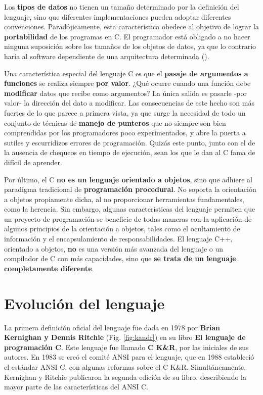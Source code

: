Los \textbf{tipos de datos} no tienen un tamaño determinado por la definición
del lenguaje, sino que diferentes implementaciones pueden adoptar
diferentes convenciones. Paradójicamente, esta característica
obedece al objetivo de lograr la \textbf{portabilidad} de los programas en C. El
programador está obligado a no hacer ninguna suposición sobre los
tamaños de los objetos de datos, ya que lo contrario haría al
software dependiente de una arquitectura determinada (). 

Una característica especial del lenguaje C es que el \textbf{pasaje de
argumentos a funciones} se realiza siempre \textbf{por valor}. ¿Qué ocurre
cuando una función debe \textbf{modificar} datos que recibe como
argumentos? La única salida es pasarle -por valor- la dirección del
dato a modificar. Las consecuencias de este hecho son más fuertes de
lo que parece a primera vista, ya que surge la necesidad de todo un
conjunto de técnicas de \textbf{manejo de punteros} que no siempre son bien
comprendidas por los programadores poco experimentados, y abre la
puerta a sutiles y escurridizos errores de programación. Quizás
este punto, junto con el de la ausencia de chequeos en tiempo de
ejecución, sean los que le dan al C fama de {\textquotedbl}difícil
de aprender{\textquotedbl}. 

Por último, el C \textbf{no es un lenguaje orientado a objetos}, sino que
adhiere al paradigma tradicional de \textbf{programación procedural}. No
soporta la orientación a objetos propiamente dicha, al no
proporcionar herramientas fundamentales, como la herencia. Sin embargo,
algunas características del lenguaje permiten que un proyecto de
programación se beneficie de todas maneras con la aplicación de
algunos principios de la orientación a objetos, tales como el
ocultamiento de información y el encapsulamiento de
responsabilidades. El lenguaje C++, orientado a objetos, \textbf{no }es
una versión más avanzada del lenguaje o un compilador de C con
más capacidades, sino que \textbf{se trata de un lenguaje completamente
diferente}. 

\section{Evolución del lenguaje}
La primera definición oficial del lenguaje fue dada en 1978 por
\textbf{Brian Kernighan y Dennis Ritchie} (Fig. \ref{fig:kandr}) en su libro \textbf{El
lenguaje de programación C}. Este lenguaje fue llamado
\textbf{C K\&R}, por las iniciales de sus autores. En 1983 se creó el comité
ANSI para el lenguaje, que en 1988 estableció el estándar ANSI C, con algunas reformas
sobre el C K\&R. Simultáneamente, Kernighan y Ritchie publicaron la
segunda edición de su libro, describiendo la mayor parte de las
características del ANSI C. 


